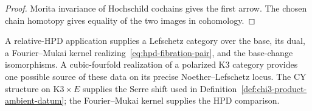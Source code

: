 \begin{proof}
Morita invariance of Hochschild cochains gives the first arrow.  The
chosen chain homotopy gives equality of the two images in cohomology.
\end{proof}

\begin{remark}
\label{rem:hpd-abs-rel-scope}
A relative-HPD application supplies a Lefschetz category over the base,
its dual, a Fourier--Mukai kernel realizing~\eqref{eq:hpd-fibration-pair},
and the base-change isomorphisms.  A cubic-fourfold realization of a
polarized K3 category provides one possible source of these data on its
precise Noether--Lefschetz locus.  The CY structure on
\(\mathrm{K3}\times E\) supplies the Serre shift used in
Definition~\ref{def:chi3-product-ambient-datum}; the Fourier--Mukai
kernel supplies the HPD comparison.
\end{remark}

\providecommand{\glinf}{\mathfrak{gl}_\infty}
\providecommand{\HC}{\mathrm{HC}}
\providecommand{\HCLie}{\mathrm{H}^{\mathrm{Lie}}}
\providecommand{\Uadm}{\mathcal U^{\mathrm{adm}}}
\providecommand{\CHHcy}{\ChirHoch^\bullet_{\mathrm{CY\text{-}3}}}
\providecommand{\Connes}{B}
\providecommand{\Kone}{K(1)}
\providecommand{\PhiFour}{\Phi_{4}}
\providecommand{\CYfour}{\mathrm{CY}\text{-}4}
\providecommand{\KKX}{\mathrm{K3}\times\mathrm{K3}}
\providecommand{\HKCY}{\mathrm{HK}\text{-}\mathrm{CY}_4}
\providecommand{\PhiFourHK}{\PhiFour\!\mid_{\HKCY}}
\providecommand{\VolKoneK}{\mathrm{Vol}(\mathrm{K3}_1)\,\mathrm{Vol}(\mathrm{K3}_2)}
\providecommand{\Mmac}{\mathsf M}
\providecommand{\PathX}{\mathsf X}
\providecommand{\PathY}{\mathsf Y}

